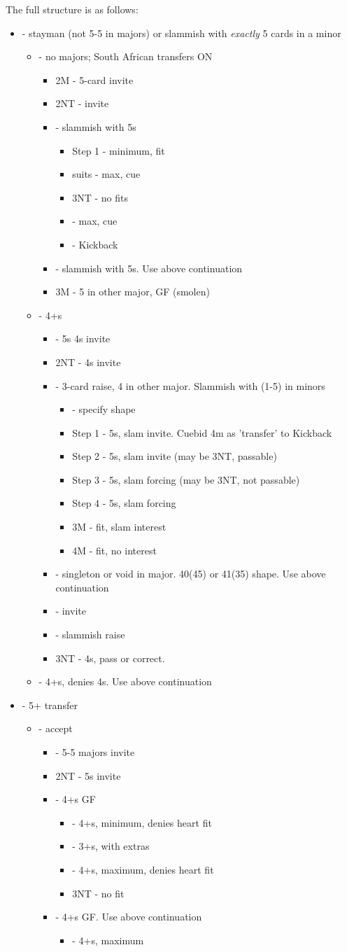 \documentclass[12pt]{report}
\newcommand{\ul}[1]{\begin{itemize}#1\end{itemize}}
\newcommand{\li}{\item[~]}
\begin{document}
    The full structure is as follows:
    \ul{
        \li {} - stayman (not 5-5 in majors) or slammish with \textit{exactly} 5 cards in a minor
        \ul{
            \li \di2 - no majors; South African transfers ON
            \ul{
                \li 2M - 5-card invite
                \li 2NT - invite
                \li \cl3 - slammish with 5\cl{}s
                \ul{
                    \li Step 1 - minimum, fit
                    \li suits - max, cue
                    \li 3NT - no fits
                    \li \cl4 - max, cue
                    \li \di4 - Kickback
                }

                \li \di3 - slammish with 5\di{}s. Use above continuation

                \li 3M - 5 in other major, GF (smolen)
            }
            \li \he2 - 4+\he{}s
            \ul {
                \li \sp2 - 5\sp{}s 4\he{}s invite
                \li 2NT - 4\sp{}s invite
                \li \cl3 - 3-card raise, 4 in other major.  Slammish with (1-5) in minors
                \ul {
                    \li \di3 - specify shape
                        \li \qquad Step 1 - 5\cl{}s, slam invite.  Cuebid 4m as 'transfer' to Kickback
                        \li \qquad Step 2 - 5\di{}s, slam invite (may be 3NT, passable)
                        \li \qquad Step 3 - 5\cl{}s, slam forcing (may be 3NT, not passable)
                        \li \qquad Step 4 - 5\di{}s, slam forcing

                    \li 3M - fit, slam interest
                    \li 4M - fit, no interest
                }
                \li \di3 - singleton or void in major.  40(45) or 41(35) shape.  Use above continuation
                \li \he3 - invite
                \li \sp3 - slammish \he{} raise
                \li 3NT - 4\sp{}s, pass or correct.
            }

            \li \sp2 - 4+\sp{}s, denies 4\he{}s.  Use above continuation
        }
        \li \di2 - 5+\he{} transfer
        \ul {
            \li \he2 - accept
            \ul {
                \li \sp2 - 5-5 majors invite
                \li 2NT - 5\he{}s invite
                \li \cl3 - 4+\cl{}s GF
                \ul {
                    \li \di3 - 4+\cl{}s, minimum, denies heart fit
                    \li \he3 - 3+\he{}s, with extras
                    \li \sp3 - 4+\cl{}s, maximum, denies heart fit
                    \li 3NT - no fit
                }
                \li \di3 - 4+\di{}s GF.  Use above continuation
                \ul {
                    \li \cl4 - 4+\di{}s, maximum
                }
                
}}}
\end{document}

